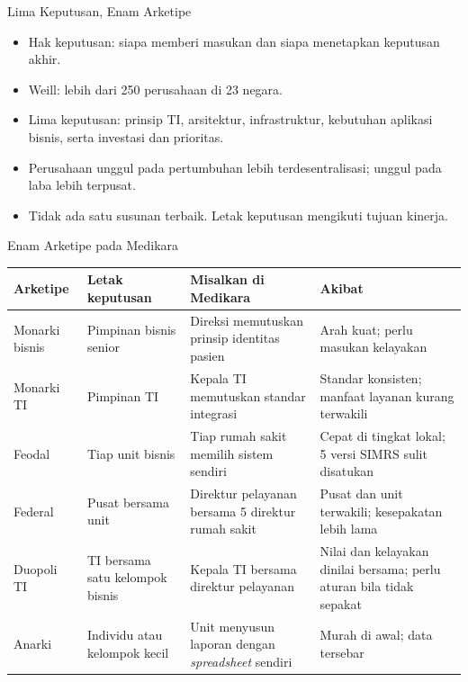 \documentclass[aspectratio=169, table, 12pt]{beamer}
\begin{document}
\begin{frame}{{\Large Lima Keputusan, Enam Arketipe}}
  \vspace{4pt}
  \small
  \begin{itemize}
    \item Hak keputusan: siapa memberi masukan dan siapa menetapkan keputusan akhir.
    \item Weill: lebih dari 250 perusahaan di 23 negara.
    \item Lima keputusan: prinsip TI, arsitektur, infrastruktur, kebutuhan aplikasi bisnis, serta
          investasi dan prioritas.
    \item Perusahaan unggul pada pertumbuhan lebih terdesentralisasi; unggul pada laba lebih terpusat.
    \item Tidak ada satu susunan terbaik. Letak keputusan mengikuti tujuan kinerja.
  \end{itemize}
\end{frame}

\begin{frame}{{\Large Enam Arketipe pada Medikara}}
  \vspace{2pt}
  \scriptsize
  \begin{tabularx}{\textwidth}{|>{\raggedright\arraybackslash}p{}|>{\raggedright\arraybackslash}p{}|>{\raggedright\arraybackslash}X|>{\raggedright\arraybackslash}X|}
    \hline
    \textbf{Arketipe} & \textbf{Letak keputusan} & \textbf{Misalkan di Medikara} & \textbf{Akibat} \\ \hline
    Monarki bisnis & Pimpinan bisnis senior & Direksi memutuskan prinsip identitas pasien & Arah kuat;
    perlu masukan kelayakan \\ \hline
    Monarki TI & Pimpinan TI & Kepala TI memutuskan standar integrasi & Standar konsisten; manfaat
    layanan kurang terwakili \\ \hline
    Feodal & Tiap unit bisnis & Tiap rumah sakit memilih sistem sendiri & Cepat di tingkat lokal; 5
    versi SIMRS sulit disatukan \\ \hline
    Federal & Pusat bersama unit & Direktur pelayanan bersama 5 direktur rumah sakit & Pusat dan unit
    terwakili; kesepakatan lebih lama \\ \hline
    Duopoli TI & TI bersama satu kelompok bisnis & Kepala TI bersama direktur pelayanan & Nilai dan
    kelayakan dinilai bersama; perlu aturan bila tidak sepakat \\ \hline
    Anarki & Individu atau kelompok kecil & Unit menyusun laporan dengan \textit{spreadsheet} sendiri &
    Murah di awal; data tersebar \\ \hline
  \end{tabularx}
\end{frame}
\end{document}

